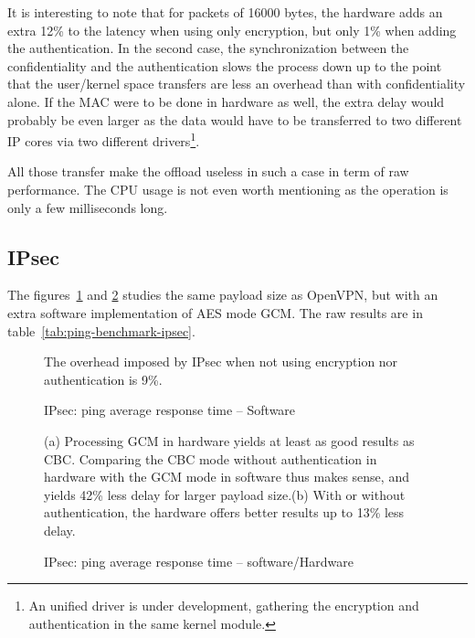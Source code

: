 \noindent It is interesting to note that for packets of 16000 bytes, the hardware adds an extra 12\% to the latency when using only encryption, but only 1\% when adding the authentication.
In the second case, the synchronization between the confidentiality and the authentication slows the process down up to the point that the user/kernel space transfers are less an overhead than with confidentiality alone.
If the MAC were to be done in hardware as well, the extra delay would probably be even larger as the data would have to be transferred to two different IP cores via two different drivers\footnote{An unified driver is under development, gathering the encryption and authentication in the same kernel module.}.

\noindent All those transfer make the offload useless in such a case in term of raw performance.
The CPU usage is not even worth mentioning as the operation is only a few milliseconds long.



\subsection{IPsec}\label{sec:lantecy-ipsec}
The figures~\ref{fig:ping-benchmark-ipsec-soft} and \ref{fig:ping-benchmark-ipsec-soft-hard}  studies the same payload size as OpenVPN, but with an extra software implementation of AES mode GCM. The raw results are in table~\ref{tab:ping-benchmark-ipsec}.

\begin{figure}[ht]

\caption{IPsec: ping average response time -- Software}{The overhead imposed by IPsec when not using encryption nor authentication is 9\%.}
\label{fig:ping-benchmark-ipsec-soft}
\end{figure}

\begin{figure}[ht]
\center
{}
\caption{IPsec: ping average response time -- software/Hardware}{\newline{}(a) Processing GCM in hardware yields at least as good results as CBC. Comparing the CBC mode without authentication in hardware with the GCM mode in software thus makes sense, and yields 42\% less delay for larger payload size.\newline{}(b) With or without authentication, the hardware offers better results up to 13\% less delay.}
\label{fig:ping-benchmark-ipsec-soft-hard}
\end{figure}

